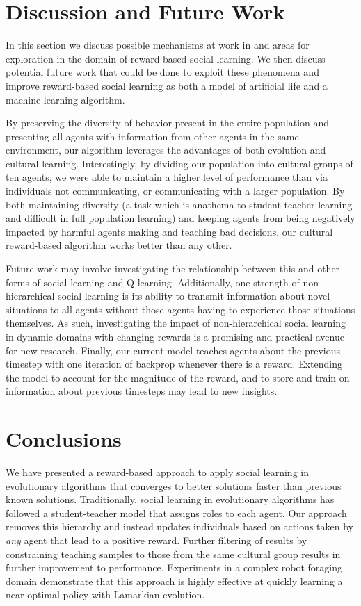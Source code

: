 \documentclass{acm_proc_article-sp}
\begin{document}
\section{Discussion and Future Work}
\label{sec:future}


In this section we discuss possible mechanisms at work in and areas for exploration in the domain of reward-based social learning.  We then discuss potential future work that could be done to exploit these phenomena and improve reward-based social learning as both a model of artificial life and a machine learning algorithm. 

By preserving the diversity of behavior present in the entire population and presenting all agents with information from other agents in the same environment, our algorithm leverages the advantages of both evolution and cultural learning. Interestingly, by dividing our population into cultural groups of ten agents, we were able to maintain a higher level of performance than via individuals not communicating, or communicating with a larger population.  By both maintaining diversity (a task which is anathema to student-teacher learning and difficult in full population learning) and keeping agents from being negatively impacted by harmful agents making and teaching bad decisions, our cultural reward-based algorithm works better than any other.

Future work may involve investigating the relationship between this and other forms of social learning and Q-learning.  Additionally, one strength of non-hierarchical social learning is its ability to transmit information about novel situations to all agents without those agents having to experience those situations themselves.  As such, investigating the impact of non-hierarchical social learning in dynamic domains with changing rewards is a promising and practical avenue for new research.  Finally, our current model teaches agents about the previous timestep with one iteration of backprop whenever there is a reward.  Extending the model to account for the magnitude of the reward, and to store and train on information about previous timesteps may lead to new insights.   

\section{Conclusions}
\label{sec:conclusions}

We have presented a reward-based approach to apply social learning in evolutionary algorithms that converges to better solutions faster than previous known solutions. Traditionally, social learning in evolutionary algorithms has followed a student-teacher model that assigns roles to each agent. Our approach removes this hierarchy and instead updates individuals based on actions taken by \textit{any} agent that lead to a positive reward.  Further filtering of results by constraining teaching samples to those from the same cultural group results in further improvement to performance.  Experiments in a complex robot foraging domain demonstrate that this approach is highly effective at quickly learning a near-optimal policy with Lamarkian evolution. 



\end{document}
